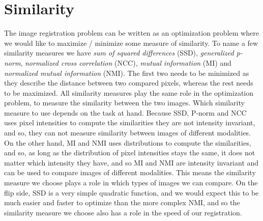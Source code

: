 \section{Similarity}
The image registration problem can be written as an optimization problem where we would like to maximize / minimize some measure of similarity. To name a few similarity measures we have \textit{sum of squared differences} (SSD), \textit{generalized p-norm}, \textit{normalized cross correlation} (NCC), \textit{mutual information} (MI) and \textit{normalized mutual information} (NMI). The first two needs to be minimized as they describe the distance between two compared pixels, whereas the rest needs to be maximized. All similarity measures play the same role in the optimization problem, to measure the similarity between the two images. Which similarity measure to use depends on the task at hand. Because SSD, P-norm and NCC uses pixel intensities to compute the similarities they are not intensity invariant, and so, they can not measure similarity between images of different modalities. On the other hand, MI and NMI uses distributions to compute the similarities, and so, as long as the distribution of pixel intensities stays the same, it does not matter which intensity they have, and so MI and NMI are intensity invariant and can be used to compare images of different modalities. This means the similarity measure we choose plays a role in which types of images we can compare. On the flip side, SSD is a very simple quadratic function, and we would expect this to be much easier and faster to optimize than the more complex NMI, and so the similarity measure we choose also has a role in the speed of our registration.